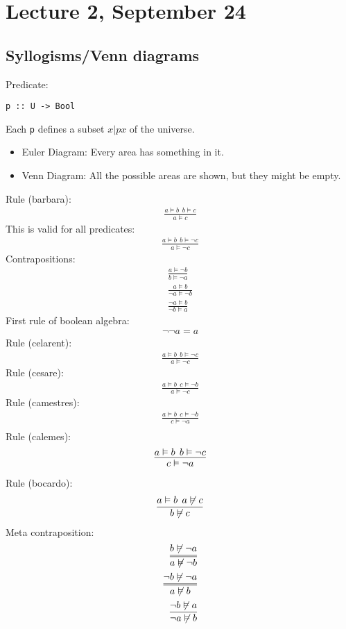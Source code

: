 \documentclass{article}
\theoremstyle{sltheorem}
\begin{document}
\section{Lecture 2, September 24}
\subsection{Syllogisms/Venn diagrams}
Predicate:
\begin{verbatim}
p :: U -> Bool
\end{verbatim}
Each \texttt{p} defines a subset ${ x | p x }$ of the universe.\\
\begin{itemize}
    \item Euler Diagram: Every area has something in it.
    \item Venn Diagram: All the possible areas are shown, but they might be empty.
\end{itemize}
Rule (barbara):
\begin{align}
    \frac{a \vDash b\:\: b \vDash c}{a \vDash c}
\end{align}
This is valid for all predicates:
\begin{align}
    \frac{a \vDash b\:\: b \vDash \neg c}{a \vDash \neg c}
\end{align}
Contrapositions:
\begin{align}
    \frac{a \vDash \neg b}{b \vDash \neg a}\\
    \frac{a \vDash b}{\neg a \vDash \neg b}\\
    \frac{\neg a \vDash b}{\neg b \vDash a}
\end{align}
First rule of boolean algebra:
\begin{align}
    \neg \neg a = a
\end{align}
Rule (celarent):
\begin{align}
    \frac{a \vDash b \:\: b \vDash \neg c}{a \vDash \neg c}
\end{align}
Rule (cesare):
\begin{align}
    \frac{a \vDash b \:\: c \vDash \neg b}{a \vDash \neg c}
\end{align}
Rule (camestres):
\begin{align}
    \frac{a\vDash b \:\: c\vDash \neg b}{c \vDash \neg a}\\
\end{align}
Rule (calemes):
\begin{align}
    \infer{c \vDash \neg a}{a\vDash b \:\: b\vDash \neg c}
\end{align}
Rule (bocardo):
\begin{align}
    \infer{b \not\vDash c}{a\vDash b\:\:a\not\vDash c}
\end{align}
Meta contraposition:
\begin{align}
    \infer={
        a\not\vDash \neg b
    }{
        b\not\vDash \neg a
    }\\
    \infer={a\not\vDash b}{\neg b \not\vDash \neg a}\\
    \infer{\neg a \not\vDash b}{\neg b \not\vDash a}
\end{align}
\end{document}
